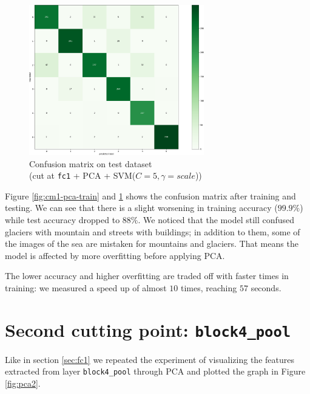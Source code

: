 \documentclass[compsoc]{IEEEtran}
\begin{document}
\begin{figure}[ht!]
\centering                                                                        
\includegraphics[width=3in]{../images/cm1-pca-test.png}
\captionsetup{justification=centering}                                                                                         
\caption{Confusion matrix on test dataset \\ (cut at \texttt{fc1} + PCA + SVM($C=5, \gamma=scale$))}
\label{fig:cm1-pca-test}                                                                                                                               
\end{figure}
Figure \ref{fig:cm1-pca-train} and \ref{fig:cm1-pca-test} shows the confusion matrix after training and testing. We can see that there is a slight worsening in training accuracy ($99.9\%$) while test accuracy dropped to $88\%$. We noticed that the model still confused glaciers with mountain and streets with buildings; in addition to them, some of the images of the sea are mistaken for mountains and glaciers. That means the model is affected by more overfitting before applying PCA. \par
The lower accuracy and higher overfitting are traded off with faster times in training: we measured a speed up of almost $10$ times, reaching $57$ seconds.












\section{Second cutting point: \texttt{block4\_pool}}

Like in section \ref{sec:fc1} we repeated the experiment of visualizing the features extracted from layer \texttt{block4\_pool} through PCA and plotted the graph in Figure \ref{fig:pca2}.
\end{document}
